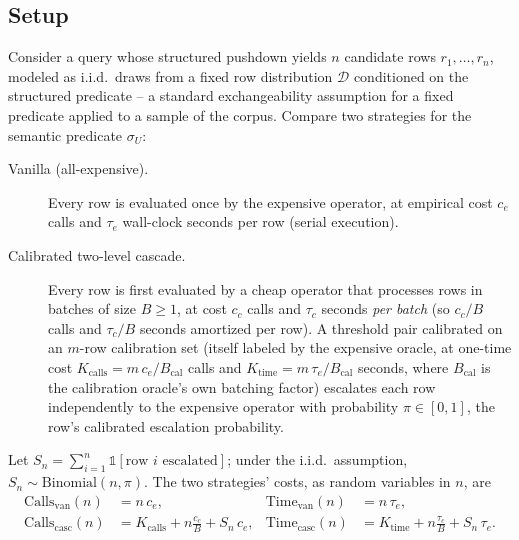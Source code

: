 \subsection{Setup}
Consider a query whose structured pushdown yields $n$ candidate rows
$r_1,\dots,r_n$, modeled as i.i.d.\ draws from a fixed row distribution
$\mathcal D$ conditioned on the structured predicate -- a standard
exchangeability assumption for a fixed predicate applied to a sample of
the corpus. Compare two strategies for the semantic predicate $\sigma_U$:

\begin{description}
\item[Vanilla (all-expensive).] Every row is evaluated once by the
  expensive operator, at empirical cost $c_e$ calls and $\tau_e$
  wall-clock seconds per row (serial execution).
\item[Calibrated two-level cascade.] Every row is first evaluated by a
  cheap operator that processes rows in batches of size $B\ge 1$, at
  cost $c_c$ calls and $\tau_c$ seconds \emph{per batch} (so $c_c/B$
  calls and $\tau_c/B$ seconds amortized per row). A threshold pair
  calibrated on an $m$-row calibration set (itself labeled by the
  expensive oracle, at one-time cost $K_{\mathrm{calls}}=m\,c_e/B_{\mathrm{cal}}$
  calls and $K_{\mathrm{time}}=m\,\tau_e/B_{\mathrm{cal}}$ seconds, where
  $B_{\mathrm{cal}}$ is the calibration oracle's own batching factor)
  escalates each row independently to the expensive operator with
  probability $\pi \in [0,1]$, the row's calibrated escalation
  probability.
\end{description}

Let $S_n = \sum_{i=1}^n \mathbb 1[\text{row } i \text{ escalated}]$; under
the i.i.d.\ assumption, $S_n \sim \mathrm{Binomial}(n,\pi)$. The two
strategies' costs, as random variables in $n$, are
\begin{align*}
  \mathrm{Calls}_{\mathrm{van}}(n) &= n\,c_e, &
  \mathrm{Time}_{\mathrm{van}}(n) &= n\,\tau_e, \\
  \mathrm{Calls}_{\mathrm{casc}}(n) &= K_{\mathrm{calls}} + n\frac{c_c}{B} + S_n\,c_e, &
  \mathrm{Time}_{\mathrm{casc}}(n) &= K_{\mathrm{time}} + n\frac{\tau_c}{B} + S_n\,\tau_e.
\end{align*}

